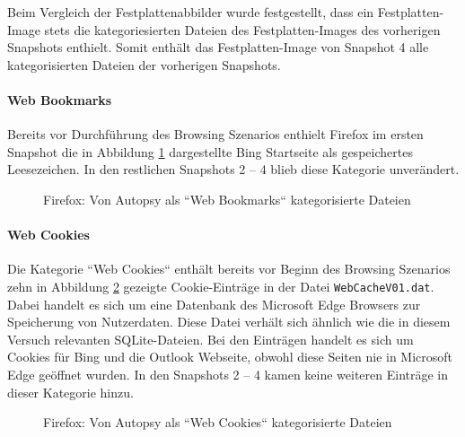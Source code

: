 \begin{appendices}
		Beim Vergleich der Festplattenabbilder wurde festgestellt, dass ein Festplatten-Image stets die kategoriesierten Dateien des Festplatten-Images des vorherigen Snapshots enthielt. Somit enthält das Festplatten-Image von Snapshot 4 alle kategorisierten Dateien der vorherigen Snapshots.
		
		\paragraph*{Web Bookmarks}
		Bereits vor Durchführung des Browsing Szenarios enthielt Firefox im ersten Snapshot die in Abbildung \ref{img:firefox-web-bookmarks} dargestellte Bing Startseite als gespeichertes Leesezeichen. In den restlichen Snapshots 2 -- 4 blieb diese Kategorie unverändert.
		\begin{figure}[h!]
			\centerline{}
			\caption{Firefox: Von Autopsy als ``Web Bookmarks`` kategorisierte Dateien}
			\label{img:firefox-web-bookmarks}  
		\end{figure}
		
		\paragraph*{Web Cookies}
		Die Kategorie ``Web Cookies`` enthält bereits vor Beginn des Browsing Szenarios zehn in Abbildung \ref{img:firefox-web-cookies} gezeigte Cookie-Einträge in der Datei \texttt{WebCacheV01.dat}. Dabei handelt es sich um eine Datenbank des Microsoft Edge Browsers zur Speicherung von Nutzerdaten. Diese Datei verhält sich ähnlich wie die in diesem Versuch relevanten SQLite-Dateien. Bei den Einträgen handelt es sich um Cookies für Bing und die Outlook Webseite, obwohl diese Seiten nie in Microsoft Edge geöffnet wurden. In den Snapshots 2 -- 4 kamen keine weiteren Einträge in dieser Kategorie hinzu.
		\begin{figure}[h!]
			\centerline{}
			\caption{Firefox: Von Autopsy als ``Web Cookies`` kategorisierte Dateien}
			\label{img:firefox-web-cookies}  
		\end{figure}
		

\end{appendices}
